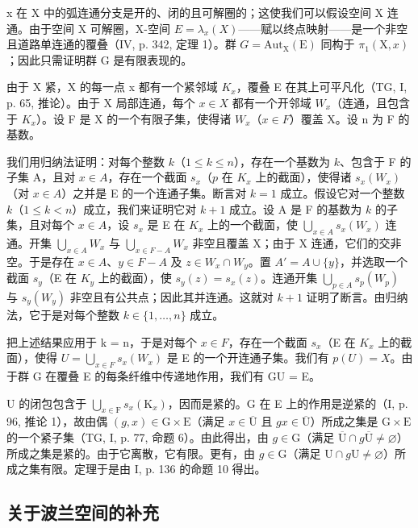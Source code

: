 x 在 X 中的弧连通分支是开的、闭的且可解圈的；这使我们可以假设空间 X 连通。由于空间 X 可解圈，X-空间 \(E = \lambda_{x}(X)\)——赋以终点映射——是一个非空且道路单连通的覆叠（IV, p. 342, 定理 1）。群 \(G = \text{Aut}_{\text{X}}(\text{E})\) 同构于 \(\pi_{1}(\text{X}, x)\)；因此只需证明群 G 是有限表现的。

由于 X 紧，X 的每一点 x 都有一个紧邻域 \(K_{x}\)，覆叠 E 在其上可平凡化（TG, I, p. 65, 推论）。由于 X 局部连通，每个 \(x \in X\) 都有一个开邻域 \(W_{x}\)（连通，且包含于 \(K_{x}\)）。设 F 是 X 的一个有限子集，使得诸 \(W_{x}\)（\(x \in F\)）覆盖 X。设 n 为 F 的基数。

我们用归纳法证明：对每个整数 \(k\)（\(1 \leqslant k \leqslant n\)），存在一个基数为 \(k\)、包含于 F 的子集 A，且对 \(x \in A\)，存在一个截面 \(s_x\)（\(p\) 在 \(K_x\) 上的截面），使得诸 \(s_x(W_x)\)（对 \(x \in A\)）之并是 E 的一个连通子集。断言对 \(k = 1\) 成立。假设它对一个整数 \(k\)（\(1 \leqslant k < n\)）成立，我们来证明它对 \(k + 1\) 成立。设 A 是 F 的基数为 \(k\) 的子集，且对每个 \(x \in A\)，设 \(s_x\) 是 E 在 \(K_x\) 上的一个截面，使 \(\bigcup_{x \in A} s_x(W_x)\) 连通。开集 \(\bigcup_{x \in A} W_x\) 与 \(\bigcup_{x \in F-A} W_x\) 非空且覆盖 X；由于 X 连通，它们的交非空。于是存在 \(x \in A\)、\(y \in F - A\) 及 \(z \in W_x \cap W_y\)。置 \(A' = A \cup \{y\}\)，并选取一个截面 \(s_y\)（E 在 \(K_y\) 上的截面），使 \(s_y(z) = s_x(z)\)。连通开集 \(\bigcup_{p \in A} s_p(W_p)\) 与 \(s_y(W_y)\) 非空且有公共点；因此其并连通。这就对 \(k + 1\) 证明了断言。由归纳法，它于是对每个整数 \(k \in \{1, \ldots, n\}\) 成立。

把上述结果应用于 k = n，于是对每个 \(x \in F\)，存在一个截面 \(s_x\)（E 在 \(K_x\) 上的截面），使得 \(U = \bigcup_{x \in F} s_x(W_x)\) 是 E 的一个开连通子集。我们有 \(p(U) = X\)。由于群 G 在覆叠 E 的每条纤维中传递地作用，我们有 GU = E。

U 的闭包包含于 \(\bigcup_{x\in\mathrm{F}}s_x(\mathrm{K}_x)\)，因而是紧的。G 在 E 上的作用是逆紧的（I, p. 96, 推论 1），故由偶 \((g,x)\in\mathrm{G}\times\mathrm{E}\)（满足 \(x\in\overline{\mathrm{U}}\) 且 \(gx\in\overline{\mathrm{U}}\)）所成之集是 \(\mathrm{G}\times\mathrm{E}\) 的一个紧子集（TG, I, p. 77, 命题 6）。由此得出，由 \(g\in\mathrm{G}\)（满足 \(\overline{\mathrm{U}}\cap g\overline{\mathrm{U}}\neq\varnothing\)）所成之集是紧的。由于它离散，它有限。更有，由 \(g\in\mathrm{G}\)（满足 \(\mathrm{U}\cap g\mathrm{U}\neq\varnothing\)）所成之集有限。定理于是由 I, p. 136 的命题 10 得出。

\subsection{关于波兰空间的补充}

